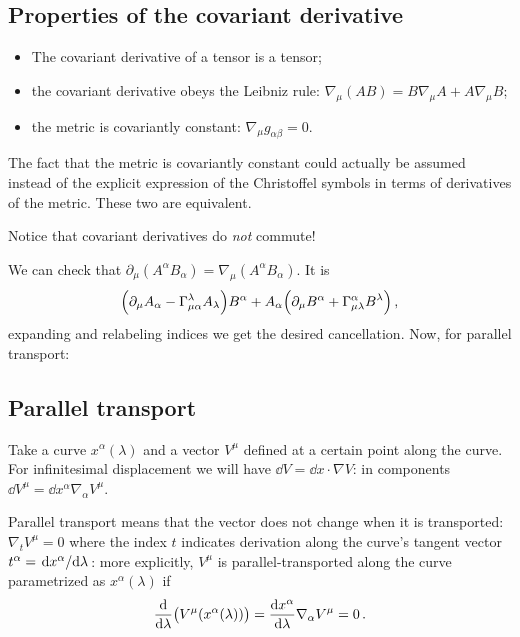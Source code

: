 \documentclass[main.tex]{subfiles}
\begin{document}
\subsection{Properties of the covariant derivative}

\begin{itemize}
    \item The covariant derivative of a tensor is a tensor;
    \item the covariant derivative obeys the Leibniz rule: \(\nabla_{\mu} (AB) = B \nabla_{\mu }A + A \nabla_{\mu }B\);
    \item the metric is covariantly constant: \(\nabla_{\mu }g_{\alpha \beta }=0\). 
\end{itemize}

The fact that the metric is covariantly constant could actually be assumed instead of the explicit expression of the Christoffel symbols in terms of derivatives of the metric. These two are equivalent.

Notice that covariant derivatives do \emph{not} commute!

We can check that \(\partial_{\mu} (A^{\alpha }B_{\alpha }) = \nabla_{\mu } (A^{\alpha }B_{\alpha })\). It is 
%
\begin{equation}
  \qty(\partial_{\mu }A_{\alpha } - \Gamma^{\lambda }_{\mu \alpha }A_{\lambda })B^{\alpha } 
  + A_{\alpha }\qty(\partial_{\mu }B^{\alpha } + \Gamma_{\mu \lambda }^{ \alpha }B^{\lambda })
\,,
\end{equation}
%
expanding and relabeling indices we get the desired cancellation. Now, for parallel transport:

\subsection{Parallel transport}

Take a curve \(x^{\alpha }(\lambda )\) and a vector \(V^{\mu }\) defined at a certain point along the curve.
For infinitesimal displacement we will have \(\dd{V} = \dd{x} \cdot \nabla V\): in components \(\dd{V^{\mu }} = \dd{x^{\alpha }} \nabla_{\alpha }V^{\mu }\).

Parallel transport means that the vector does not change when it is transported: \(\nabla_t V^{\mu }=0\) where the index \(t \) indicates derivation along the curve's tangent vector \(t^{\alpha }= \dv*{x^{\alpha }}{\lambda } \): more explicitly, \(V^{\mu }\) is parallel-transported along the curve parametrized as \(x^{\alpha }(\lambda )\) if 
%
\begin{align}
\dv{}{\lambda } \qty(V^{\mu }(x^{\alpha }(\lambda )))
=
\dv{x^{\alpha }}{\lambda } \nabla_{\alpha } V^{\mu } 
= 0
\,.
\end{align}
\end{document}
